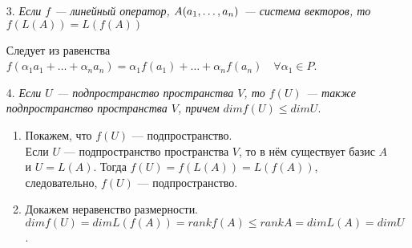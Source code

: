 \begin{enumerate}
	\item[3.] \textit{Если $f$ --- линейный оператор, $A(a_1,\dots,a_n)$ --- система векторов, то $f(L(A)) = L(f(A))$} \begin{Proof} Следует из равенства
		$f(\alpha_1 a_1 + \ldots + \alpha_n a_n) = \alpha_1 f(a_1) + \ldots + \alpha_n f(a_n)\quad \forall\alpha_1 \in P$.
	\end{Proof}
	\item[4.] \textit{Если $U$ --- подпространство пространства $V$, то $f(U)$ --- также подпространство пространства $V$, причем} $dimf(U) \leqslant dimU.$
	\begin{Proof}
		\begin{enumerate}
			\item Покажем, что $f(U)$ --- подпространство.\\
			Если $U$ --- подпространство пространства $V$, то в нём существует базис $A$ и $U = L(A)$. Тогда $f(U) = f(L(A)) = L(f(A))$, следовательно, $f(U)$ --- подпространство.
			\item Докажем неравенство размерности.\\
			$dim f(U) = dim L(f(A)) = rank f(A) \leqslant rank A = dim L(A) = dim U$.
		\end{enumerate}
	\end{Proof}
\end{enumerate}









